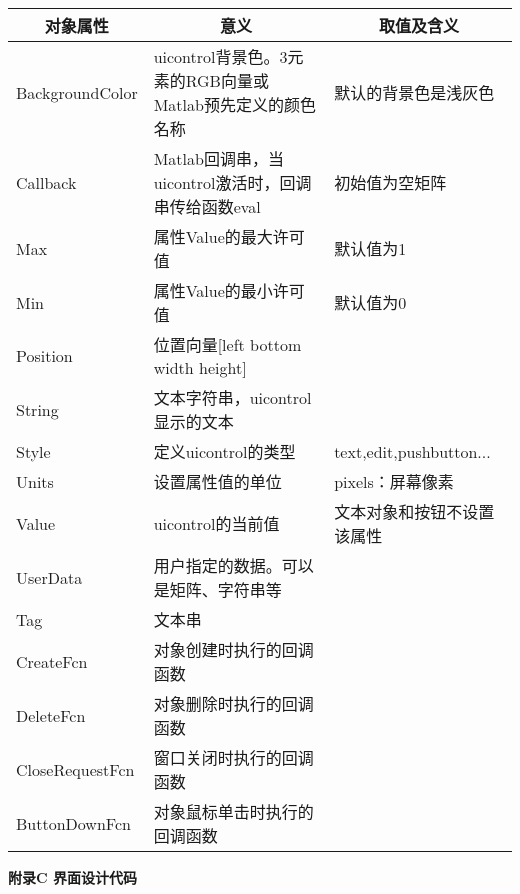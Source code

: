 \begin{tabular}{|p{3cm}|p{5cm}|p{5cm}|}
	\hline
	\multicolumn{1}{|c|}{\textbf{对象属性}}	&\multicolumn{1}{c}{\textbf{意义}}	&\multicolumn{1}{|c|}{\textbf{取值及含义}}\\	\hline
	BackgroundColor	&uicontrol背景色。3元素的RGB向量或Matlab预先定义的颜色名称	&默认的背景色是浅灰色		\\	\hline
	Callback		&Matlab回调串，当uicontrol激活时，回调串传给函数eval	   &初始值为空矩阵			\\	\hline
	Max				&属性Value的最大许可值									 &默认值为1				\\	\hline
	Min				&属性Value的最小许可值									 &默认值为0				\\	\hline
	Position		&位置向量[left bottom width height]					   	&					    \\	\hline
	String			&文本字符串，uicontrol显示的文本						    &					 \\	\hline
	Style			&定义uicontrol的类型					&text,edit,pushbutton...				\\	\hline
	Units			&设置属性值的单位										&pixels：屏幕像素		\\	\hline
	Value			&uicontrol的当前值										&文本对象和按钮不设置该属性	\\	\hline
	UserData		&用户指定的数据。可以是矩阵、字符串等						&						\\	\hline
	Tag				&文本串												&						\\	\hline
	CreateFcn		&对象创建时执行的回调函数								&						\\	\hline
	DeleteFcn		&对象删除时执行的回调函数								&						\\	\hline
	CloseRequestFcn		&窗口关闭时执行的回调函数							&						\\	\hline
	ButtonDownFcn		&对象鼠标单击时执行的回调函数						  &						\\	\hline
\end{tabular}
\newpage
\begin{center}
	\textbf{附录C 界面设计代码}
\end{center}
